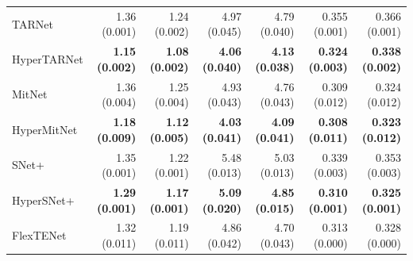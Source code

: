 \documentclass{article}
\begin{document}
\begin{table}[htb!]
\begin{tabular}{lrrrrrr}
		TARNet         & 1.36 (0.001) & 1.24 (0.002) &  4.97 (0.045) & 4.79	(0.040) & 0.355	(0.001) &	0.366	(0.001) \\
		HyperTARNet    & \textbf{1.15 (0.002)} & \textbf{1.08 (0.002)} &  \textbf{4.06 (0.040)} & \textbf{4.13 (0.038)} & \textbf{0.324	(0.003)} &	\textbf{0.338	(0.002)} \\ \hline
		MitNet       & 1.36 (0.004) & 1.25 (0.004) &  4.93	(0.043) &	4.76	(0.043) & 0.309	(0.012) &	0.324	(0.012) \\
		HyperMitNet  & \textbf{1.18 (0.009)} & \textbf{1.12	(0.005)} &  \textbf{4.03 (0.041)} & \textbf{4.09 (0.041)} & \textbf{0.308	(0.011)} &	\textbf{0.323	(0.012)} \\ \hline
		SNet+          & 1.35 (0.001) & 1.22 (0.001) &  5.48 (0.013) & 5.03 (0.013) & 0.339	(0.003) &	0.353	(0.003)\\
		HyperSNet+     & \textbf{1.29 (0.001)} & \textbf{1.17 (0.001)} &  \textbf{5.09 (0.020)} &	\textbf{4.85 (0.015)}  & \textbf{0.310	(0.001)} &	\textbf{0.325	(0.001)}\\ \hline
		FlexTENet      & 1.32 (0.011) & 1.19 (0.011) &  4.86 (0.042) &	4.70 (0.043) & 0.313	(0.000)	& 0.328	(0.000)  \\
		\hline
	\end{tabular}
\end{table}
\end{document}
